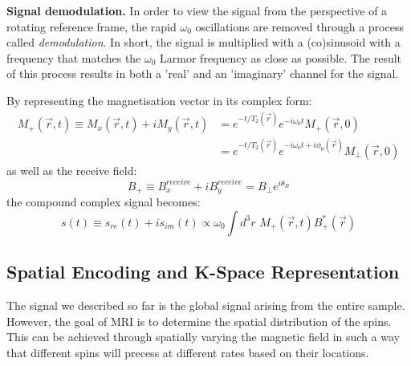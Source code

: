 \hfill

\textbf{Signal demodulation.} In order to view the signal from the perspective of a rotating reference frame, the rapid $\omega_0$ oscillations are removed through a process called \textit{demodulation}.
In short, the signal is multiplied with a (co)sinusoid with a frequency that matches the $\omega_0$ Larmor frequency as close as possible.
The result of this process results in both a 'real' and an 'imaginary' channel for the signal.

By representing the magnetisation vector in its complex form:
\begin{equation}\label{eq:716}
\begin{aligned}
    M_{+}(\vec{r},t) \equiv M_x(\vec{r},t) + i M_y(\vec{r},t) &= e^{- t/T_2(\vec{r})} e^{-i \omega_0 t } M_+(\vec{r},0) \\
    &= e^{- t/T_2(\vec{r})} e^{-i \omega_0 t + i \phi_0(\vec{r})} M_{\perp}(\vec{r},0)
\end{aligned}
\end{equation}
as well as the receive field:
\begin{equation}\label{eq:729}
    B_{+} \equiv B_x^{receive} + i B_y^{receive} = B_{\perp} e^{i \theta_B}
\end{equation}
the compound complex signal becomes:
\begin{equation}\label{eq:730}
    s(t) \equiv s_{re}(t) + i s_{im}(t) \propto \omega_0 \int d^3 r \, \,  M_{+}(\vec{r},t) B^*_{+}(\vec{r})
\end{equation}

\hfill

\subsection{Spatial Encoding and K-Space Representation}

The signal we described so far is the global signal arising from the entire sample.
However, the goal of MRI is to determine the spatial distribution of the spins.
This can be achieved through spatially varying the magnetic field in such a way that different spins will precess at different rates based on their locations.

\hfill 

